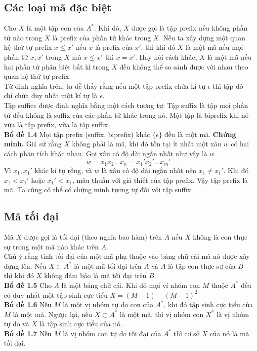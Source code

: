 \documentclass[14pt]{extreport}
\begin{document}
\subsection{Các loại mã đặc biệt}
Cho $X$ là một tập con của $A^*$. Khi đó, $X$ được gọi là tập prefix nếu không phần tử nào trong $X$ là prefix của phần tử khác trong $X$. Nếu ta xây dựng một quan hệ thứ tự prefix $x \leq x'$ nếu $x$ là prefix của $x'$, thi khi đó $X$ là một mã nếu mọi phần tử $ x, x'$ trong $X$ mà $x \leq x'$ thì $x = x'$. Hay nói cách khác, $X$ là một mã nếu hai phần tử phân biệt bất kì trong $X$ đều không thể so sánh được với nhau theo quan hệ thứ tự prefix. \\
Từ định nghĩa trên, ta dễ thấy rằng nếu một tập prefix chứa kí tự $\epsilon $ thì tập đó chỉ chứa duy nhất một kí tự là $\epsilon$.\\
Tập suffice được định nghĩa bằng một cách tương tự: Tập suffix là tập mọi phần tử đều không là suffix của các phần tử khác trong nó. Một tập là biprefix khi nó vừa là tập prefix, vừa là tập suffix. \\
\textbf{Bổ đề 1.4} Mọi tập prefix (suffix, biprefix) khác $\{ \epsilon \} $ đều là một mã.
\textbf{Chứng minh.} Giả sử rằng $X$ không phải là mã, khi đó tồn tại ít nhất một xâu $w$ có hai cách phân tích khác nhau. Gọi xâu có độ dài ngắn nhất như vậy là $w$
$$w = x_1x_2...x_n = x_1'x_2'...x_m'$$
Vì $x_1, x_1'$ khác kí tự rỗng, và $w$ là xâu có độ dài ngắn nhất nên $x_1 \neq x_1'$. Khi đó $x_1 < x_1'$ hoặc $x_1' < x_1$, mâu thuẫn với giả thiết của tập prefix. Vậy tập prefix là mã. Ta cũng có thể có chứng minh tương tự đối với tập suffix.

\subsection{Mã tối đại}
Mã $X$ được gọi là tối đại (theo nghĩa bao hàm) trên $A$ nếu $X$ không là con thực sự trong một mã nào khác trên $A$.\\
Chú ý rằng tính tối đại của một mã phụ thuộc vào bảng chữ cái mà nó được xây dựng lên. Nếu $X \subset A^*$ là một mã tối đại trên $A$ và $A$ là tập con thực sự của $B$ thì khi đó $X$ không đảm bảo là mã tối đại trên $B$.\\
\textbf{Bổ đề 1.5} Cho $A$ là một bảng chữ cái. Khi đó mọi ví nhóm con $M$ thuộc $A^*$ đều có duy nhất một tập sinh cực tiểu $X = (M-1) - (M-1)^2$\\
\textbf{Bổ đề 1.6} Nếu $M$ là một vị nhóm tự do con của $A^*$, khi đó tập sinh cực tiểu của $M$ là một mã. Ngược lại, nếu $X \subset A^*$ là một mã, thì vị nhóm con $X^*$ là vị nhóm tự do và $X$ là tập sinh cực tiểu của nó.\\
\textbf{Bổ đề 1.7} Nếu $M$ là vị nhóm con tự do tối đại của $A^*$ thì cơ sở $X$ của nó là mã tối đại.
\end{document}
